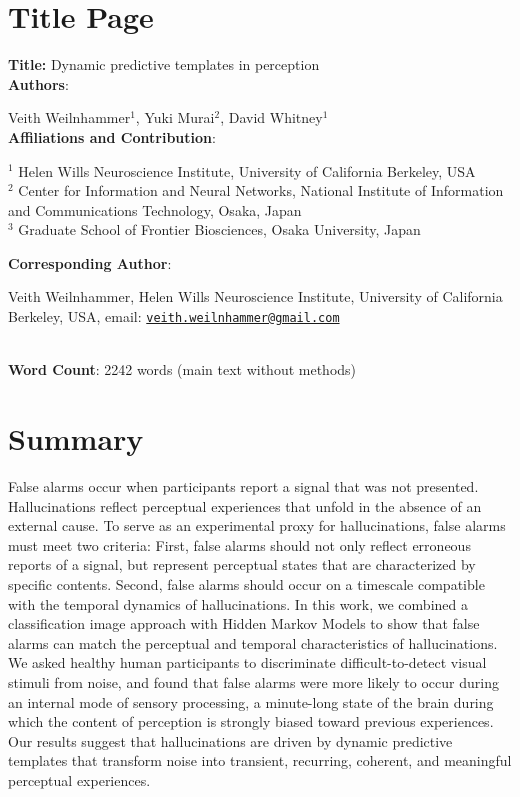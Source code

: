 \documentclass[
]{article}
\author{}
\date{\vspace{-2.5em}}
\begin{document}
\hypertarget{title-page}{%
\section{Title Page}\label{title-page}}

\textbf{Title:} Dynamic predictive templates in perception\\

\textbf{Authors}:

Veith Weilnhammer\(^{1}\), Yuki Murai\(^{2}\), David Whitney\(^{1}\)\\

\hfill\break
\textbf{Affiliations and Contribution}:

\(^{1}\) Helen Wills Neuroscience Institute, University of California
Berkeley, USA\\
\(^{2}\) Center for Information and Neural Networks, National Institute
of Information and Communications Technology, Osaka, Japan\\
\(^{3}\) Graduate School of Frontier Biosciences, Osaka University,
Japan\\

\hfill\break

\textbf{Corresponding Author}:

Veith Weilnhammer, Helen Wills Neuroscience Institute, University of
California Berkeley, USA, email:
\href{mailto:veith.weilnhammer@gmail.com}{\nolinkurl{veith.weilnhammer@gmail.com}}\\
\strut \\
\textbf{Word Count}: 2242 words (main text without methods)\\

\newpage
\linenumbers

\hypertarget{summary}{%
\section{Summary}\label{summary}}

False alarms occur when participants report a signal that was not
presented. Hallucinations reflect perceptual experiences that unfold in
the absence of an external cause. To serve as an experimental proxy for
hallucinations, false alarms must meet two criteria: First, false alarms
should not only reflect erroneous reports of a signal, but represent
perceptual states that are characterized by specific contents. Second,
false alarms should occur on a timescale compatible with the temporal
dynamics of hallucinations. In this work, we combined a classification
image approach with Hidden Markov Models to show that false alarms can
match the perceptual and temporal characteristics of hallucinations. We
asked healthy human participants to discriminate difficult-to-detect
visual stimuli from noise, and found that false alarms were more likely
to occur during an internal mode of sensory processing, a minute-long
state of the brain during which the content of perception is strongly
biased toward previous experiences. Our results suggest that
hallucinations are driven by dynamic predictive templates that transform
noise into transient, recurring, coherent, and meaningful perceptual
experiences.
\end{document}
